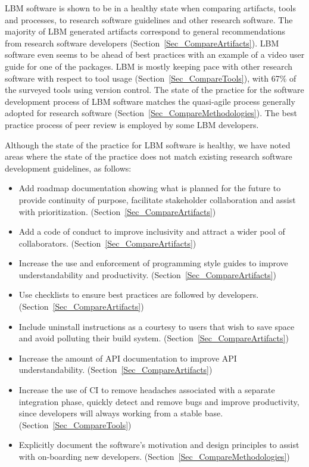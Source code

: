 \documentclass[final, 3p, times, authoryear]{elsarticle}
\begin{document}
LBM software is shown to be in a healthy state when comparing artifacts, tools
and processes, to research software guidelines and other research software.  The
majority of LBM generated artifacts correspond to general recommendations from
research software developers (Section~\ref{Sec_CompareArtifacts}).  LBM software
even seems to be ahead of best practices with an example of a video user guide
for one of the packages. LBM is mostly keeping pace with other research software
with respect to tool usage (Section~\ref{Sec_CompareTools}), with 67\% of the
surveyed tools using version control.  The state of the practice for the
software development process of LBM software matches the quasi-agile process
generally adopted for research software
(Section~\ref{Sec_CompareMethodologies}).  The best practice process of peer
review is employed by some LBM developers.

Although the state of the practice for LBM software is healthy, we have noted
areas where the state of the practice does not match existing research software
development guidelines, as follows:

\begin{itemize}
	\item Add roadmap documentation showing what is planned for the future to
	provide continuity of purpose, facilitate stakeholder collaboration and
	assist with prioritization. (Section~\ref{Sec_CompareArtifacts})
	\item Add a code of conduct to improve inclusivity and attract a wider pool
	of collaborators. (Section~\ref{Sec_CompareArtifacts})
	\item Increase the use and enforcement of programming style guides to improve understandability and productivity. (Section~\ref{Sec_CompareArtifacts})
	\item Use checklists to ensure best practices are followed by developers. (Section~\ref{Sec_CompareArtifacts})
	\item Include uninstall instructions as a courtesy to users that wish to
	save space and avoid polluting their build system.
	(Section~\ref{Sec_CompareArtifacts})
	\item Increase the amount of API documentation to improve API
	understandability. (Section~\ref{Sec_CompareArtifacts})
	\item Increase the use of CI to remove headaches associated with a separate
	integration phase, quickly detect and remove bugs and improve productivity,
	since developers will always working from a stable base.
	(Section~\ref{Sec_CompareTools})
	\item Explicitly document the software's motivation and design principles to
	assist with on-boarding new developers.
	(Section~\ref{Sec_CompareMethodologies})
\end{itemize}
\end{document}
